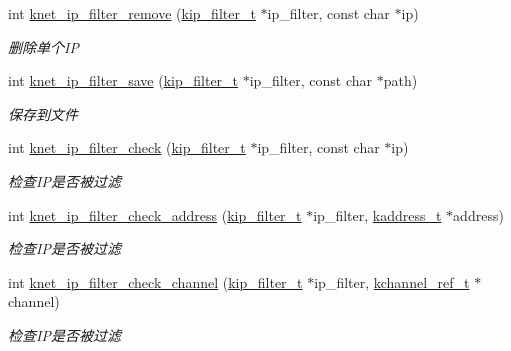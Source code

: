 \begin{DoxyCompactItemize}
int \hyperlink{a00116_gae03dc5307ec374e375c2313d27dd08ad_gae03dc5307ec374e375c2313d27dd08ad}{knet\+\_\+ip\+\_\+filter\+\_\+remove} (\hyperlink{a00056_a1c0c604eecd86fc8895cf4bbbba566af_a1c0c604eecd86fc8895cf4bbbba566af}{kip\+\_\+filter\+\_\+t} $\ast$ip\+\_\+filter, const char $\ast$ip)
\begin{DoxyCompactList}\small\item\em 删除单个\+I\+P \end{DoxyCompactList}\item 
int \hyperlink{a00116_ga1425a397cc96d8a1cdf32bff3f1fe645_ga1425a397cc96d8a1cdf32bff3f1fe645}{knet\+\_\+ip\+\_\+filter\+\_\+save} (\hyperlink{a00056_a1c0c604eecd86fc8895cf4bbbba566af_a1c0c604eecd86fc8895cf4bbbba566af}{kip\+\_\+filter\+\_\+t} $\ast$ip\+\_\+filter, const char $\ast$path)
\begin{DoxyCompactList}\small\item\em 保存到文件 \end{DoxyCompactList}\item 
int \hyperlink{a00116_ga6d722330898e2a29a8555d711aab8b01_ga6d722330898e2a29a8555d711aab8b01}{knet\+\_\+ip\+\_\+filter\+\_\+check} (\hyperlink{a00056_a1c0c604eecd86fc8895cf4bbbba566af_a1c0c604eecd86fc8895cf4bbbba566af}{kip\+\_\+filter\+\_\+t} $\ast$ip\+\_\+filter, const char $\ast$ip)
\begin{DoxyCompactList}\small\item\em 检查\+I\+P是否被过滤 \end{DoxyCompactList}\item 
int \hyperlink{a00116_gaa42afdd4af32db13227e991ad457f229_gaa42afdd4af32db13227e991ad457f229}{knet\+\_\+ip\+\_\+filter\+\_\+check\+\_\+address} (\hyperlink{a00056_a1c0c604eecd86fc8895cf4bbbba566af_a1c0c604eecd86fc8895cf4bbbba566af}{kip\+\_\+filter\+\_\+t} $\ast$ip\+\_\+filter, \hyperlink{a00056_a44e99fab0348ec54cfee119ddd9ceed6_a44e99fab0348ec54cfee119ddd9ceed6}{kaddress\+\_\+t} $\ast$address)
\begin{DoxyCompactList}\small\item\em 检查\+I\+P是否被过滤 \end{DoxyCompactList}\item 
int \hyperlink{a00116_gae44a5a6a2fc4cb6e86ae5fda52dff9d6_gae44a5a6a2fc4cb6e86ae5fda52dff9d6}{knet\+\_\+ip\+\_\+filter\+\_\+check\+\_\+channel} (\hyperlink{a00056_a1c0c604eecd86fc8895cf4bbbba566af_a1c0c604eecd86fc8895cf4bbbba566af}{kip\+\_\+filter\+\_\+t} $\ast$ip\+\_\+filter, \hyperlink{a00056_a3b7e82599367eade261456f60ebe2cd9_a3b7e82599367eade261456f60ebe2cd9}{kchannel\+\_\+ref\+\_\+t} $\ast$channel)
\begin{DoxyCompactList}\small\item\em 检查\+I\+P是否被过滤 \end{DoxyCompactList}\end{DoxyCompactItemize}


